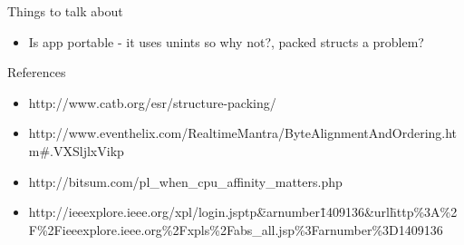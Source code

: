 \documentclass[a4paper, titlepage]{article}
\begin{document}

\listoftodos

\newpage

Things to talk about

\begin{itemize}
	\item Is app portable - it uses unints so why not?, packed structs a problem?
\end{itemize}

References

\begin{itemize}
	\item http://www.catb.org/esr/structure-packing/
	\item http://www.eventhelix.com/RealtimeMantra/ByteAlignmentAndOrdering.htm\#.VXSljlxVikp
	\item http://bitsum.com/pl\_when\_cpu\_affinity\_matters.php
	\item http://ieeexplore.ieee.org/xpl/login.jsp\?tp\=\&arnumber\=1409136\&url\=http\%3A\%2F\%2Fieeexplore.ieee.org\%2Fxpls\%2Fabs\_all.jsp\%3Farnumber\%3D1409136
\end{itemize}

\newpage


\newpage

\newpage

\newpage
\tableofcontents
\newpage

\newpage

\newpage

\newpage

\newpage

\newpage

\newpage

%
%

\newpage

\end{document}
